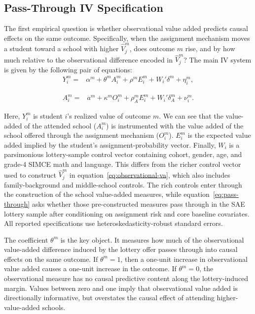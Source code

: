 \documentclass[a4paper, article, english, oneside, unknownkeysallowed, 12pt]{memoir}
\begin{document}
\subsection{Pass-Through IV Specification}

The first empirical question is whether observational value added predicts causal effects on the same outcome.
Specifically, when the assignment mechanism moves a student toward a school with higher $\widehat{V}_j^m$, does outcome $m$ rise, and by how much relative to the observational difference encoded in $\widehat{V}_j^m$?
The main IV system is given by the following pair of equations:
\noindent
  \begin{equation}
    \begin{aligned}
      Y_i^m ={}& \alpha^m + \theta^m A_i^m + \rho^m E_i^m +  W_i'\delta^m + \eta_i^m,
    \end{aligned}
    \label{eq:pass-through}
  \end{equation}

  \begin{equation}
    \begin{aligned}
      A_i^m ={}& a^m + \kappa^m O_i^m + \rho_A^m E_i^m +  W_i'\delta_A^m + \nu_i^m.
    \end{aligned}
    \label{eq:first-stage}
  \end{equation}

Here, $Y_i^m$ is student $i$'s realized value of outcome $m$. We can see that the value-added of the attended school ($A_i^m$) is instrumented with the value added of the school offered through the assignment mechanism ($O_i^m$).
$E_i^m$ is the expected value added implied by the student's assignment-probability vector.
Finally, $W_i$ is a parsimonious lottery-sample control vector containing cohort, gender, age, and grade-4 SIMCE math and language.
This differs from the richer control vector used to construct $\widehat{V}_j^m$ in equation~\eqref{eq:observational-va}, which also includes family-background and middle-school controls.
The rich controls enter through the construction of the school value-added measures, while equation~\eqref{eq:pass-through} asks whether those pre-constructed measures pass through in the SAE lottery sample after conditioning on assignment risk and core baseline covariates.
All reported specifications use heteroskedasticity-robust standard errors.

The coefficient $\theta^m$ is the key object.
It measures how much of the observational value-added difference induced by the lottery offer passes through into causal effects on the same outcome.
If $\theta^m=1$, then a one-unit increase in observational value added causes a one-unit increase in the outcome.
If $\theta^m=0$, the observational measure has no causal predictive content along the lottery-induced margin.
Values between zero and one imply that observational value added is directionally informative, but overstates the causal effect of attending higher-value-added schools.
\end{document}
